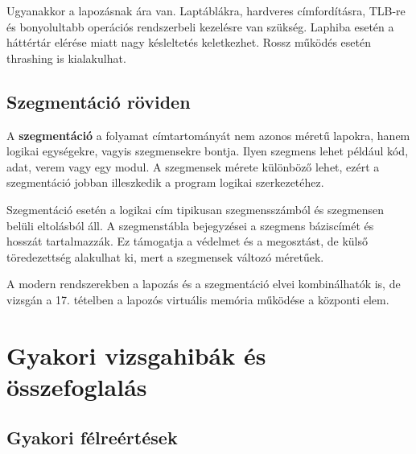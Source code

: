 Ugyanakkor a lapozásnak ára van. Laptáblákra, hardveres címfordításra, TLB-re és bonyolultabb operációs rendszerbeli kezelésre van szükség. Laphiba esetén a háttértár elérése miatt nagy késleltetés keletkezhet. Rossz működés esetén thrashing is kialakulhat.

\begin{center}

\end{center}

\subsection{Szegmentáció röviden}

A \textbf{szegmentáció} a folyamat címtartományát nem azonos méretű lapokra, hanem logikai egységekre, vagyis szegmensekre bontja. Ilyen szegmens lehet például kód, adat, verem vagy egy modul. A szegmensek mérete különböző lehet, ezért a szegmentáció jobban illeszkedik a program logikai szerkezetéhez.

Szegmentáció esetén a logikai cím tipikusan szegmensszámból és szegmensen belüli eltolásból áll. A szegmenstábla bejegyzései a szegmens báziscímét és hosszát tartalmazzák. Ez támogatja a védelmet és a megosztást, de külső töredezettség alakulhat ki, mert a szegmensek változó méretűek.

A modern rendszerekben a lapozás és a szegmentáció elvei kombinálhatók is, de vizsgán a 17. tételben a lapozós virtuális memória működése a központi elem.

\section{Gyakori vizsgahibák és összefoglalás}

\subsection{Gyakori félreértések}

